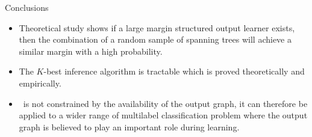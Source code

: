 \documentclass[first=dgreen,second=purple,logo=yellowexc]{aaltoslides}
\begin{document}
%
\begin{frame}{Conclusions}
	\begin{itemize}\footnotesize
		\item Theoretical study shows if a large margin structured output learner exists,  then the combination of a random sample of spanning trees will achieve a similar margin with a high probability.
		\item The $K$-best inference algorithm is tractable which is proved theoretically and empirically.
		\item \rta\ is not constrained by the availability of the output graph, it can therefore be applied to a wider range of multilabel classification problem where the output graph is believed to play an important role during learning.
	\end{itemize}
\end{frame}




\iffalse
\begin{frame}[allowframebreaks]{Bibliography}
	
	
\end{frame}
\fi
\end{document}
